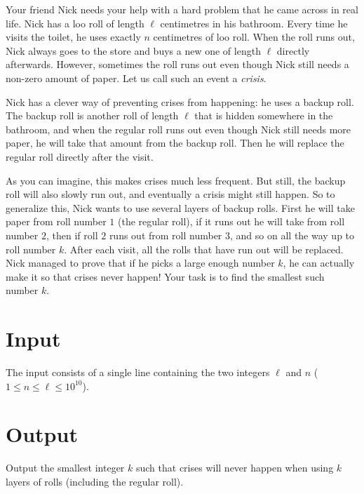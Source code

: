 
%
\noindent
Your friend Nick needs your help with a hard problem that he came across in real life. 
Nick has a loo roll of length $\ell$ centimetres in his bathroom. Every time he visits the toilet, he uses exactly $n$ centimetres of loo roll. 
When the roll runs out, Nick always goes to the store and buys a new one of length $\ell$ directly afterwards. 
However, sometimes the roll runs out even though Nick still needs a non-zero amount of paper. Let us call such an event a \emph{crisis}.

Nick has a clever way of preventing crises from happening: he uses a backup roll. 
The backup roll is another roll of length $\ell$ that is hidden somewhere in the bathroom, and when the regular roll runs out even though Nick still needs more paper, he will take that amount from the backup roll. 
Then he will replace the regular roll directly after the visit.

As you can imagine, this makes crises much less frequent. 
But still, the backup roll will also slowly run out, and eventually a crisis might still happen. 
So to generalize this, Nick wants to use several layers of backup rolls. 
First he will take paper from roll number $1$ (the regular roll), if it runs out he will take from roll number $2$, then if roll $2$ runs out from roll number $3$, and so on all the way up to roll number $k$. 
After each visit, all the rolls that have run out will be replaced. Nick managed to prove that if he picks a large enough number $k$, he can actually make it so that crises never happen! 
Your task is to find the smallest such number $k$.

\section*{Input}

The input consists of a single line containing the two integers $\ell$ and $n$ ($1 \leq n \leq \ell \leq 10^{10}$).

\section*{Output}

Output the smallest integer $k$ such that crises will never happen when
using $k$ layers of rolls (including the regular roll).
